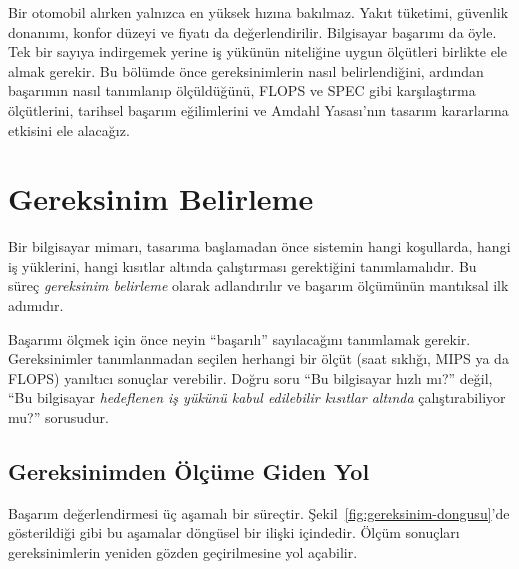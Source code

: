 Bir otomobil alırken yalnızca en yüksek hızına bakılmaz. Yakıt tüketimi, güvenlik donanımı, konfor düzeyi ve fiyatı da değerlendirilir. Bilgisayar başarımı da öyle. Tek bir sayıya indirgemek yerine iş yükünün niteliğine uygun ölçütleri birlikte ele almak gerekir. Bu bölümde önce gereksinimlerin nasıl belirlendiğini, ardından başarımın nasıl tanımlanıp ölçüldüğünü, FLOPS ve SPEC gibi karşılaştırma ölçütlerini, tarihsel başarım eğilimlerini ve Amdahl Yasası'nın tasarım kararlarına etkisini ele alacağız.


\section{Gereksinim Belirleme}
\label{sec:gereksinim-belirleme}

Bir bilgisayar mimarı, tasarıma başlamadan önce sistemin hangi koşullarda, hangi iş yüklerini, hangi kısıtlar altında çalıştırması gerektiğini tanımlamalıdır. Bu süreç \emph{gereksinim belirleme} olarak adlandırılır ve başarım ölçümünün mantıksal ilk adımıdır.

\begin{tanim}
Başarımı ölçmek için önce neyin ``başarılı'' sayılacağını tanımlamak gerekir. Gereksinimler tanımlanmadan seçilen herhangi bir ölçüt (saat sıklığı, MIPS ya da FLOPS) yanıltıcı sonuçlar verebilir. Doğru soru ``Bu bilgisayar hızlı mı?'' değil, ``Bu bilgisayar \emph{hedeflenen iş yükünü kabul edilebilir kısıtlar altında} çalıştırabiliyor mu?'' sorusudur.
\end{tanim}


\subsection{Gereksinimden Ölçüme Giden Yol}
\label{subsec:gereksinimden-olcume}

Başarım değerlendirmesi üç aşamalı bir süreçtir. Şekil~\ref{fig:gereksinim-dongusu}'de gösterildiği gibi bu aşamalar döngüsel bir ilişki içindedir. Ölçüm sonuçları gereksinimlerin yeniden gözden geçirilmesine yol açabilir.

